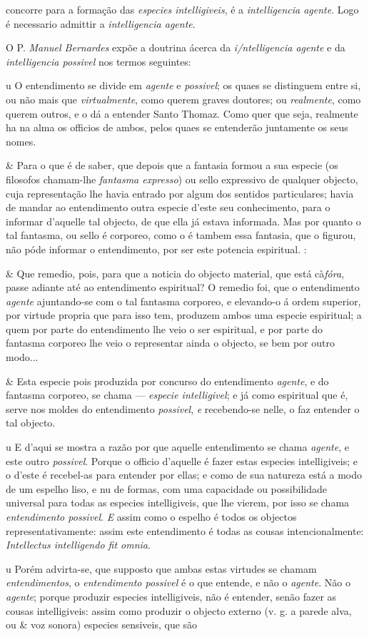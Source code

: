 concorre para a formação das \emph{especies intelligiveis}, é a \emph{intelligencia agente}. Logo é necessario admittir a \emph{intelligencia agente}.\par O P. \emph{Manuel Bernardes} expõe a doutrina ácerca da \emph{i/ntelligencia agente} e da \emph{intelligencia possivel} nos termos seguintes:\par u O entendimento se divide em \emph{agente} e \emph{possivel}; os quaes se distinguem entre si, ou não mais que \emph{virtualmente}, como querem graves doutores; ou \emph{realmente}, como querem outros, e o dá a entender Santo Thomaz. Como quer que seja, realmente ha na alma os officios de ambos, pelos quaes se entenderão juntamente os seus nomes.\par \& Para o que é de saber, que depois que a fantasia formou a sua especie (os filosofos chamam-lhe \emph{fantasma expresso}) ou sello expressivo de qualquer objecto, cuja representação lhe havia entrado por algum dos sentidos particulares; havia de mandar ao entendimento outra especie d'este seu conhecimento, para o informar d'aquelle tal objecto, de que ella já estava informada. Mas por quanto o tal fantasma, ou sello é corporeo, como o é tambem essa fantasia, que o figurou, não póde informar o entendimento, por ser este potencia espiritual. :\par \& Que remedio, pois, para que a noticia do objecto material, que está cà\emph{fóra}, passe adiante até ao entendimento espiritual? O remedio foi, que o entendimento \emph{agente} ajuntando-se com o tal fantasma corporeo, e elevando-o á ordem superior, por virtude propria que para isso tem, produzem ambos uma especie espiritual; a quem por parte do entendimento lhe veio o ser espiritual, e por parte do fantasma corporeo lhe veio o representar ainda o objecto, se bem por outro modo...\par \& Esta especie pois produzida por concurso do entendimento \emph{agente}, e do fantasma corporeo, se chama --- \emph{especie intelligivel}; e já como espiritual que é, serve nos moldes do entendimento \emph{possivel}, \emph{e} recebendo-se nelle, o faz entender o tal objecto.\par u E d'aqui se mostra a razão por que aquelle entendimento se chama \emph{agente}, e este outro \emph{possivel}. Porque o officio d'aquelle é fazer estas especies intelligiveis; e o d'este é recebel-as para entender por ellas; e como de sua natureza está a modo de um espelho liso, e nu de formas, com uma capacidade ou possibilidade universal para todas as especies intelligiveis, que lhe vierem, por isso se chama \emph{entendimento possivel}. \emph{E} assim como o espelho é todos os objectos representativamente: assim este entendimento é todas as cousas intencionalmente: \emph{Intellectus intelligendo fit omnia}.\par u Porém advirta-se, que supposto que ambas estas virtudes se chamam \emph{entendimentos}, o \emph{entendimento possivel} é o que entende, e não o \emph{agente}. Não o \emph{agente}; porque produzir especies intelligiveis, não é entender, senão fazer as cousas intelligiveis: assim como produzir o objecto externo (v. g. a parede alva, ou \& voz sonora) especies sensiveis, que são 